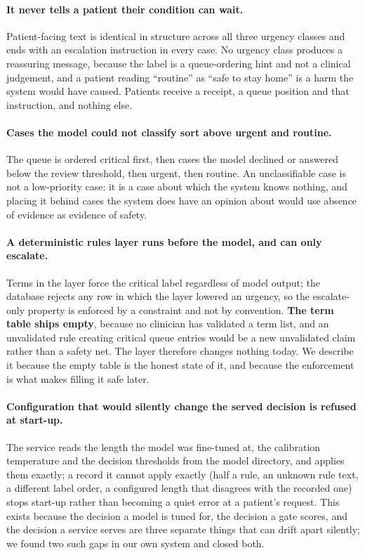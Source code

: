 \paragraph{It never tells a patient their condition can wait.} Patient-facing
text is identical in structure across all three urgency classes and ends with an
escalation instruction in every case. No urgency class produces a reassuring
message, because the label is a queue-ordering hint and not a clinical judgement,
and a patient reading ``routine'' as ``safe to stay home'' is a harm the system
would have caused. Patients receive a receipt, a queue position and that
instruction, and nothing else.

\paragraph{Cases the model could not classify sort above urgent and routine.}
The queue is ordered critical first, then cases the model declined or answered
below the review threshold, then urgent, then routine. An unclassifiable case is
not a low-priority case: it is a case about which the system knows nothing, and
placing it behind cases the system does have an opinion about would use absence
of evidence as evidence of safety.

\paragraph{A deterministic rules layer runs before the model, and can only
escalate.} Terms in the layer force the critical label regardless of model
output; the database rejects any row in which the layer lowered an urgency, so
the escalate-only property is enforced by a constraint and not by convention.
\textbf{The term table ships empty}, because no clinician has validated a term
list, and an unvalidated rule creating critical queue entries would be a new
unvalidated claim rather than a safety net. The layer therefore changes nothing
today. We describe it because the empty table is the honest state of it, and
because the enforcement is what makes filling it safe later.

\paragraph{Configuration that would silently change the served decision is
refused at start-up.} The service reads the length the model was fine-tuned at,
the calibration temperature and the decision thresholds from the model directory,
and applies them exactly; a record it cannot apply exactly (half a rule, an
unknown rule text, a different label order, a configured length that disagrees
with the recorded one) stops start-up rather than becoming a quiet error at a
patient's request. This exists because the decision a model is tuned for, the
decision a gate scores, and the decision a service serves are three separate
things that can drift apart silently; we found two such gaps in our own system
and closed both.

